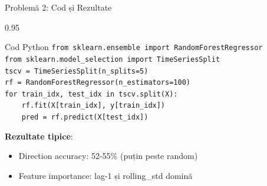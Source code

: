 \documentclass[9pt, aspectratio=169, t]{beamer}
\begin{document}
\begin{frame}{Problemă 2: Cod și Rezultate}
    \begin{cminipage}{0.95\textwidth}
    \begin{exampleblock}{Cod Python}
        {\footnotesize
        \texttt{from sklearn.ensemble import RandomForestRegressor}\\
        \texttt{from sklearn.model\_selection import TimeSeriesSplit}\\[0.2cm]
        \texttt{tscv = TimeSeriesSplit(n\_splits=5)}\\
        \texttt{rf = RandomForestRegressor(n\_estimators=100)}\\[0.2cm]
        \texttt{for train\_idx, test\_idx in tscv.split(X):}\\
        \texttt{~~~~rf.fit(X[train\_idx], y[train\_idx])}\\
        \texttt{~~~~pred = rf.predict(X[test\_idx])}
        }
    \end{exampleblock}

    \vspace{0.2cm}
    \textbf{Rezultate tipice}:
    \begin{itemize}\setlength{\itemsep}{0pt}
        \item Direction accuracy: 52-55\% (puțin peste random)
        \item Feature importance: lag-1 și rolling\_std domină
    \end{itemize}
    \end{cminipage}
\end{frame}
\end{document}
